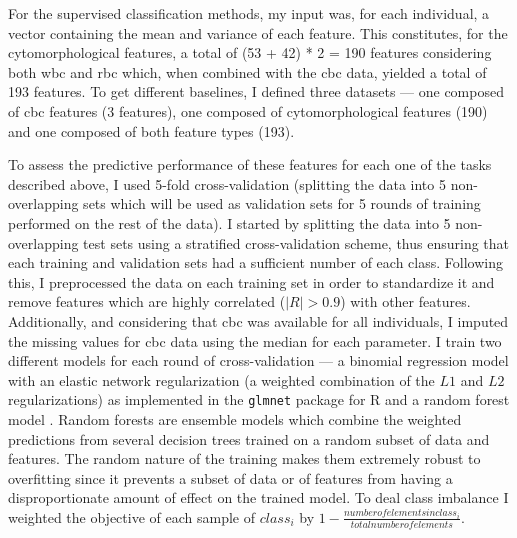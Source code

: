 For the supervised classification methods, my input was, for each individual, a vector containing the mean and variance of each feature. This constitutes, for the cytomorphological features, a total of (53 + 42) * 2 = 190 features considering both \ac{wbc} and \ac{rbc} which, when combined with the \ac{cbc} data, yielded a total of 193 features. To get different baselines, I defined three datasets --- one composed of \ac{cbc} features (3 features), one composed of cytomorphological features (190) and one composed of both feature types (193). 

To assess the predictive performance of these features for each one of the tasks described above, I used 5-fold cross-validation (splitting the data into 5 non-overlapping sets which will be used as validation sets for 5 rounds of training performed on the rest of the data). I started by splitting the data into 5 non-overlapping test sets using a stratified cross-validation scheme, thus ensuring that each training and validation sets had a sufficient number of each class. Following this, I preprocessed the data on each training set in order to standardize it and remove features which are highly correlated ($|R|>0.9$) with other features. Additionally, and considering that \ac{cbc} was available for all individuals, I imputed the missing values for \ac{cbc} data using the median for each parameter. I train two different models for each round of cross-validation --- a binomial regression model with an elastic network regularization (a weighted combination of the $L1$ and $L2$ regularizations) as implemented in the \texttt{glmnet} package for R \cite{Friedman2010-gl} and a random forest model \cite{Breiman2001-yz}. Random forests are ensemble models which combine the weighted predictions from several decision trees trained on a random subset of data and features. The random nature of the training makes them extremely robust to overfitting since it prevents a subset of data or of features from having a disproportionate amount of effect on the trained model. To deal class imbalance I weighted the objective of each sample of $class_i$ by $1-\frac{number of elements in class_i}{total number of elements}$. 


